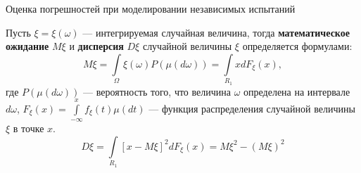 \documentclass{beamer}
\begin{document}
	\begin{frame} {Оценка погрешностей при моделировании независимых испытаний}

		
		Пусть $\xi=\xi(\omega)$ --- интегрируемая случайная величина, тогда \textbf{математическое ожидание} $M\xi$ и \textbf{дисперсия} $D\xi$ случайной величины $\xi$ определяется формулами:
		\[
			M\xi = \int\limits_{\varOmega} \xi (\omega) P(\mu (d \omega) )
			= \int \limits_{R_1} x  d F_{\xi}(x) 
			,
		\]
		где $P(\mu( d \omega))$ %
		--- вероятность того, что величина $\omega$ определена на интервале $d\omega$, 
		$F_{\xi} (x)=\int \limits_{-\infty}^{x} f_{\xi} (t) \mu (dt)$ --- функция распределения случайной величины $\xi$ в точке $x$.
		\[
			D\xi = \int \limits_{R_1} {[x - M \xi]}^2 d F_{\xi}(x) 
			= M \xi^2 - {(M \xi)}^2
		\]

				
	\end{frame}
\end{document}
